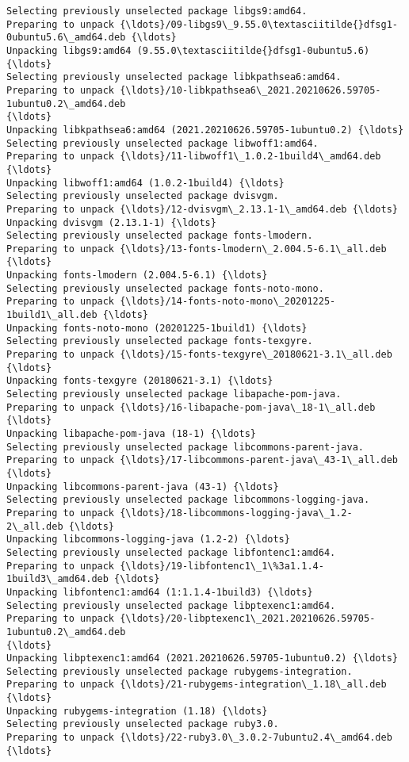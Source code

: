 \documentclass[11pt]{article}
\begin{document}
\begin{Verbatim}[commandchars=\\\{\}]
Selecting previously unselected package libgs9:amd64.
Preparing to unpack {\ldots}/09-libgs9\_9.55.0\textasciitilde{}dfsg1-0ubuntu5.6\_amd64.deb {\ldots}
Unpacking libgs9:amd64 (9.55.0\textasciitilde{}dfsg1-0ubuntu5.6) {\ldots}
Selecting previously unselected package libkpathsea6:amd64.
Preparing to unpack {\ldots}/10-libkpathsea6\_2021.20210626.59705-1ubuntu0.2\_amd64.deb
{\ldots}
Unpacking libkpathsea6:amd64 (2021.20210626.59705-1ubuntu0.2) {\ldots}
Selecting previously unselected package libwoff1:amd64.
Preparing to unpack {\ldots}/11-libwoff1\_1.0.2-1build4\_amd64.deb {\ldots}
Unpacking libwoff1:amd64 (1.0.2-1build4) {\ldots}
Selecting previously unselected package dvisvgm.
Preparing to unpack {\ldots}/12-dvisvgm\_2.13.1-1\_amd64.deb {\ldots}
Unpacking dvisvgm (2.13.1-1) {\ldots}
Selecting previously unselected package fonts-lmodern.
Preparing to unpack {\ldots}/13-fonts-lmodern\_2.004.5-6.1\_all.deb {\ldots}
Unpacking fonts-lmodern (2.004.5-6.1) {\ldots}
Selecting previously unselected package fonts-noto-mono.
Preparing to unpack {\ldots}/14-fonts-noto-mono\_20201225-1build1\_all.deb {\ldots}
Unpacking fonts-noto-mono (20201225-1build1) {\ldots}
Selecting previously unselected package fonts-texgyre.
Preparing to unpack {\ldots}/15-fonts-texgyre\_20180621-3.1\_all.deb {\ldots}
Unpacking fonts-texgyre (20180621-3.1) {\ldots}
Selecting previously unselected package libapache-pom-java.
Preparing to unpack {\ldots}/16-libapache-pom-java\_18-1\_all.deb {\ldots}
Unpacking libapache-pom-java (18-1) {\ldots}
Selecting previously unselected package libcommons-parent-java.
Preparing to unpack {\ldots}/17-libcommons-parent-java\_43-1\_all.deb {\ldots}
Unpacking libcommons-parent-java (43-1) {\ldots}
Selecting previously unselected package libcommons-logging-java.
Preparing to unpack {\ldots}/18-libcommons-logging-java\_1.2-2\_all.deb {\ldots}
Unpacking libcommons-logging-java (1.2-2) {\ldots}
Selecting previously unselected package libfontenc1:amd64.
Preparing to unpack {\ldots}/19-libfontenc1\_1\%3a1.1.4-1build3\_amd64.deb {\ldots}
Unpacking libfontenc1:amd64 (1:1.1.4-1build3) {\ldots}
Selecting previously unselected package libptexenc1:amd64.
Preparing to unpack {\ldots}/20-libptexenc1\_2021.20210626.59705-1ubuntu0.2\_amd64.deb
{\ldots}
Unpacking libptexenc1:amd64 (2021.20210626.59705-1ubuntu0.2) {\ldots}
Selecting previously unselected package rubygems-integration.
Preparing to unpack {\ldots}/21-rubygems-integration\_1.18\_all.deb {\ldots}
Unpacking rubygems-integration (1.18) {\ldots}
Selecting previously unselected package ruby3.0.
Preparing to unpack {\ldots}/22-ruby3.0\_3.0.2-7ubuntu2.4\_amd64.deb {\ldots}

\end{Verbatim}
\end{document}
